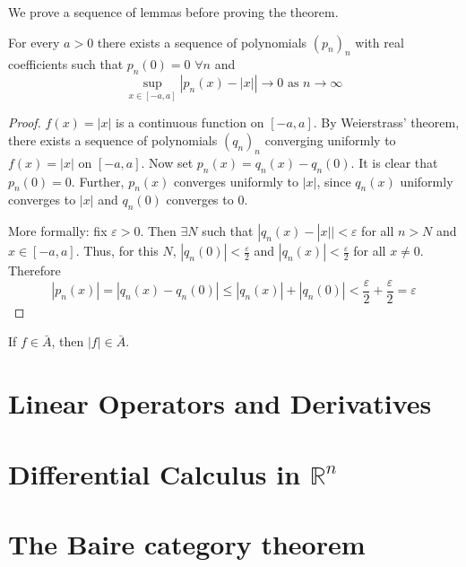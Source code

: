 \documentclass[11pt]{article}
\numberwithin{equation}{section}
\theoremstyle{definition}
\theoremstyle{definition}
\newcommand\abs[1]{\left| #1 \right|}
\newcommand{\1}{\mathbbm 1}
\newcommand{\e}{\varepsilon}
\newcommand{\RR}{\mathbb R}
\begin{document}
We prove a sequence of lemmas before proving the theorem. 

\begin{lemma}
	For every $a > 0$ there exists a sequence of polynomials $(p_n)_n$ with real coefficients such that $p_n(0) = 0$ $\forall n$ and
	\begin{equation}
		\sup_{x \in [-a,a]}\abs{p_n(x) - \abs{x}} \to 0 \text{ as } n \to \infty
	\end{equation}
\end{lemma}
\begin{proof}
	$f(x) = \abs{x}$ is a continuous function on $[-a,a]$. By Weierstrass' theorem, there exists a sequence of polynomials $(q_n)_n$ converging uniformly to $f(x) = \abs{x}$ on $[-a,a]$. Now set $p_n(x) = q_n(x) - q_n(0)$. It is clear that $p_n(0) = 0$. Further, $p_n(x)$ converges uniformly to $|x|$, since $q_n(x)$ uniformly converges to $|x|$ and $q_n(0)$ converges to 0. 

	More formally: fix $\e > 0$. Then $\exists N$ such that $|q_n(x) - |x|| < \e$ for all $n>N$ and $x \in [-a,a]$. Thus, for this $N$, $|q_n(0)|< \frac{\e}{2}$ and $|q_n(x)| < \frac{\e}{2}$ for all $x \neq 0$. Therefore
	\begin{equation}
		|p_n(x)| = |q_n(x) - q_n(0)| \leq |q_n(x)| + |q_n(0)| < \frac{\e}{2} + \frac{\e}{2} = \e
	\end{equation}
\end{proof}

\begin{lemma}[]
	If $f \in \bar{A}$, then $|f| \in \bar{A}$.
\end{lemma}













\newpage
\section{Linear Operators and Derivatives}

\section[Differential Calculus in Rn]{Differential Calculus in $\RR^n$}

\section{The Baire category theorem}
\end{document}
